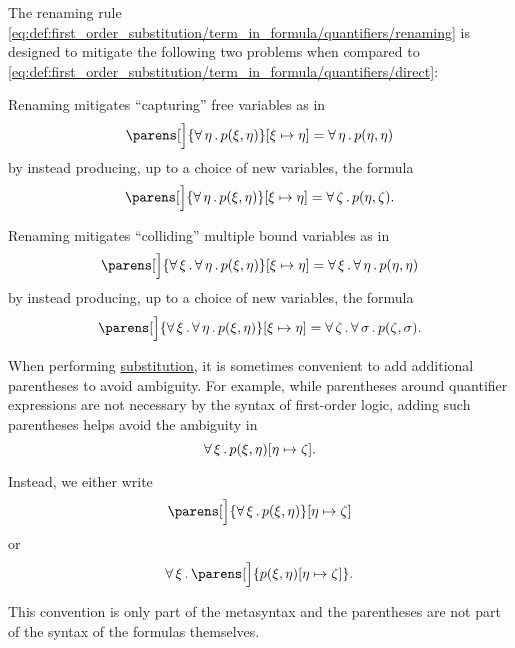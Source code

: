 \begin{remark}\label{rem:first_order_substitution_renaming_justification}
  The renaming rule \eqref{eq:def:first_order_substitution/term_in_formula/quantifiers/renaming} is designed to mitigate the following two problems when compared to \eqref{eq:def:first_order_substitution/term_in_formula/quantifiers/direct}:

  \begin{thmenum}
     Renaming mitigates \enquote{capturing} free variables as in
    \begin{equation*}
      \parens[\Big]{ \qforall \eta p(\xi, \eta) }[\xi \mapsto \eta] = \qforall \eta p(\eta, \eta)
    \end{equation*}
    by instead producing, up to a choice of new variables, the formula
    \begin{equation*}
      \parens[\Big]{ \qforall \eta p(\xi, \eta) }[\xi \mapsto \eta] = \qforall \zeta p(\eta, \zeta).
    \end{equation*}

     Renaming mitigates \enquote{colliding} multiple bound variables as in
    \begin{equation*}
      \parens[\Big]{ \qforall \xi \qforall \eta p(\xi, \eta) }[\xi \mapsto \eta] = \qforall \xi \qforall \eta p(\eta, \eta)
    \end{equation*}
    by instead producing, up to a choice of new variables, the formula
    \begin{equation*}
      \parens[\Big]{ \qforall \xi \qforall \eta p(\xi, \eta) }[\xi \mapsto \eta] = \qforall \zeta \qforall \sigma p(\zeta, \sigma).
    \end{equation*}
  \end{thmenum}
\end{remark}

\begin{remark}\label{rem:first_order_substitution_parentheses}
  When performing \hyperref[def:first_order_substitution]{substitution}, it is sometimes convenient to add additional parentheses to avoid ambiguity. For example, while parentheses around quantifier expressions are not necessary by the syntax of first-order logic, adding such parentheses helps avoid the ambiguity in
  \begin{equation*}
    \forall \thinspace \xi \thinspace . \thinspace p(\xi, \eta) [\eta \mapsto \zeta].
  \end{equation*}

  Instead, we either write
  \begin{equation*}
    \parens[\Big]{ \qforall \xi p(\xi, \eta) } [\eta \mapsto \zeta]
  \end{equation*}
  or
  \begin{equation*}
    \qforall \xi \parens[\Big]{ p(\xi, \eta)[\eta \mapsto \zeta] }.
  \end{equation*}

  This convention is only part of the metasyntax and the parentheses are not part of the syntax of the formulas themselves.
\end{remark}

